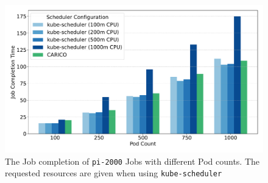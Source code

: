 %

\begin{figure}[ht!]
    \centering
    \includegraphics[width=\textwidth]{images/pi-job-completion.pdf}
    \caption{The Job completion of \texttt{pi-2000} Jobs with different Pod
    counts. The requested resources are given when using \texttt{kube-scheduler}}
    \label{fig:pi-2000-throughput}
\end{figure}

